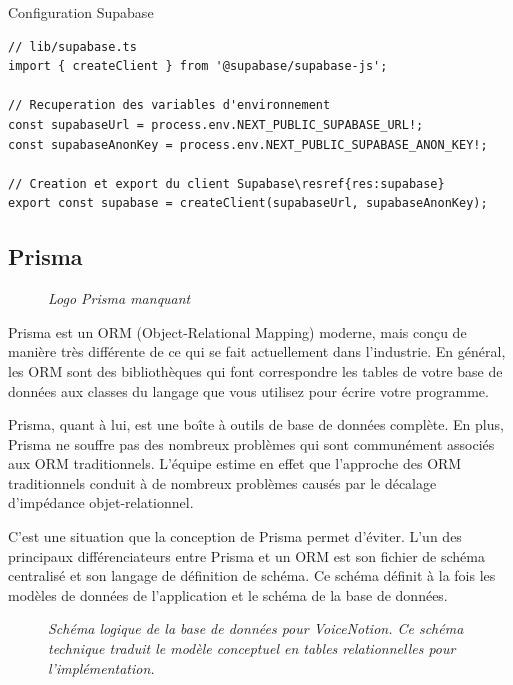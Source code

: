 \begin{codebox}{Configuration Supabase}
\begin{lstlisting}
// lib/supabase.ts
import { createClient } from '@supabase/supabase-js';

// Recuperation des variables d'environnement
const supabaseUrl = process.env.NEXT_PUBLIC_SUPABASE_URL!;
const supabaseAnonKey = process.env.NEXT_PUBLIC_SUPABASE_ANON_KEY!;

// Creation et export du client Supabase\resref{res:supabase}
export const supabase = createClient(supabaseUrl, supabaseAnonKey);
\end{lstlisting}
\end{codebox}

\subsection{Prisma}
\begin{figure}
    \centering
    \textit{Logo Prisma manquant}
\end{figure}
Prisma est un ORM (Object-Relational Mapping) moderne, mais conçu de manière très différente de ce qui se fait actuellement dans l'industrie. En général, les ORM sont des bibliothèques qui font correspondre les tables de votre base de données aux classes du langage que vous utilisez pour écrire votre programme.

Prisma, quant à lui, est une boîte à outils de base de données complète. En plus, Prisma ne souffre pas des nombreux problèmes qui sont communément associés aux ORM traditionnels. L'équipe estime en effet que l'approche des ORM traditionnels conduit à de nombreux problèmes causés par le décalage d'impédance objet-relationnel.

C'est une situation que la conception de Prisma permet d'éviter. L'un des principaux différenciateurs entre Prisma et un ORM est son fichier de schéma centralisé et son langage de définition de schéma. Ce schéma définit à la fois les modèles de données de l'application et le schéma de la base de données.

\begin{figure}[H]
\centering
\textit{Schéma logique de la base de données pour VoiceNotion. \newline\textit{Ce schéma technique traduit le modèle conceptuel en tables relationnelles pour l'implémentation.}}
\label{fig:prisma-schema}
\end{figure}

